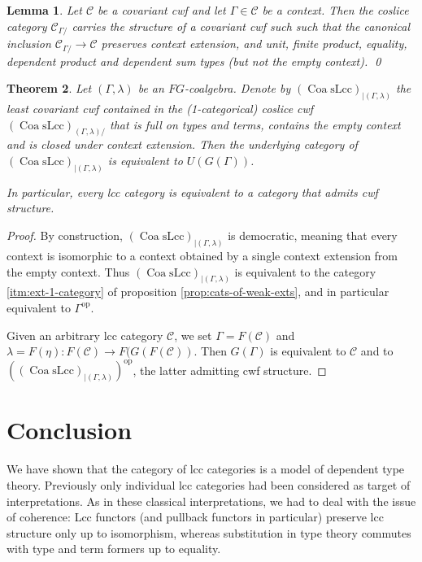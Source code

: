 \documentclass[a4paper]{article}
\newtheorem{theorem}{Theorem}
\newtheorem{lemma}[theorem]{Lemma}
\theoremstyle{remark}
\theoremstyle{definition}
\begin{document}
\begin{lemma}
  Let $\mathcal{C}$ be a covariant cwf and let $\Gamma \in \mathcal{C}$ be a context.
  Then the coslice category $\mathcal{C}_{\Gamma /}$ carries the structure of a covariant cwf such such that the canonical inclusion $\mathcal{C}_{\Gamma /} \rightarrow \mathcal{C}$ preserves context extension, and unit, finite product, equality, dependent product and dependent sum types (but not the empty context).
  \qed
\end{lemma}

\begin{theorem}
  \label{th:context-as-model}
  Let $(\Gamma, \lambda)$ be an $FG$-coalgebra.
  Denote by $(\operatorname{Coa} \mathrm{sLcc})_{| (\Gamma, \lambda)}$ the least covariant cwf contained in the (1-categorical) coslice cwf $(\operatorname{Coa} \mathrm{sLcc})_{(\Gamma, \lambda) /}$ that is full on types and terms, contains the empty context and is closed under context extension.
  Then the underlying category of $(\operatorname{Coa} \mathrm{sLcc})_{| (\Gamma, \lambda)}$ is equivalent to $U(G(\Gamma))$.

  In particular, every lcc category is equivalent to a category that admits cwf structure.
\end{theorem}
\begin{proof}
  By construction, $(\operatorname{Coa} \mathrm{sLcc})_{| (\Gamma, \lambda)}$ is democratic, meaning that every context is isomorphic to a context obtained by a single context extension from the empty context.
  Thus $(\operatorname{Coa} \mathrm{sLcc})_{| (\Gamma, \lambda)}$ is equivalent to the category \ref{itm:ext-1-category} of proposition \ref{prop:cats-of-weak-exts}, and in particular equivalent to $\Gamma^\mathrm{op}$.

  Given an arbitrary lcc category $\mathcal{C}$, we set $\Gamma = F(\mathcal{C})$ and $\lambda = F(\eta) : F(\mathcal{C}) \rightarrow F(G(F(\mathcal{C}))$.
  Then $G(\Gamma)$ is equivalent to $\mathcal{C}$ and to $((\operatorname{Coa} \mathrm{sLcc})_{| (\Gamma, \lambda)})^\mathrm{op}$, the latter admitting cwf structure.
\end{proof}

\section{Conclusion}

We have shown that the category of lcc categories is a model of dependent type theory.
Previously only individual lcc categories had been considered as target of interpretations.
As in these classical interpretations, we had to deal with the issue of coherence:
Lcc functors (and pullback functors in particular) preserve lcc structure only up to isomorphism, whereas substitution in type theory commutes with type and term formers up to equality.
\end{document}
